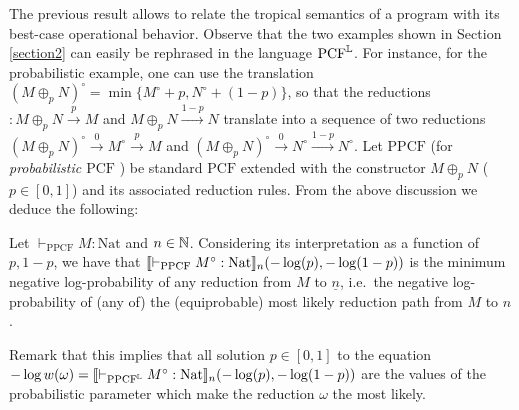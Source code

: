 The previous result allows to relate the tropical semantics of a program with its best-case operational behavior.  
Observe that the two examples shown in Section \ref{section2} can easily be rephrased in the language $\mathrm{PCF}^{\mathbb{L}}$. 
For instance, for the probabilistic example, %
one can use the translation $(M\oplus_{p}N)^{\circ}= \min\{M^{\circ}+p, N^{\circ}+(1-p)\}$, so that the reductions $:M\oplus_{p}N\stackrel{p}{\to} M$ and $M\oplus_{p}N\stackrel{1-p}{\to} N$ translate into a sequence of two reductions $(M\oplus_{p}N)^{\circ} \stackrel{0}{\to} M^{\circ}\stackrel{p}{\to} M$ and $(M\oplus_{p}N)^{\circ} \stackrel{0}{\to} N^{\circ}\stackrel{1-p}{\to} N^{\circ}$. %
Let $\mathrm{PPCF}$ (for \emph{probabilistic $\mathrm{PCF}$} \cite{Pagani2018}) be standard $\mathrm{PCF}$ extended with the constructor $M\oplus_{p}N$ ($p\in[0,1]$) and its associated reduction rules. From the above discussion we deduce the following:

\begin{corollary}
Let $\vdash_{\mathrm{PPCF}} M:\mathrm{Nat}$ and $n\in\mathbb{N}$.
Considering its interpretation as a function of $p,1-p$, we have that $\llbracket\vdash_{\mathrm{PPCF}} M^{\circ}:\mathrm{Nat}\rrbracket_{n}(-\log(p),-\log(1-p))$ %
is the minimum negative log-probability of any reduction from $M$ to $\underline n$, i.e.\ the negative log-probability of (any of) the (equiprobable) most likely reduction path from $M$ to $n$.
\end{corollary}

Remark that this implies that all solution $p\in[0,1]$ to the equation $-\log \mathsf  w(\omega)= \model{\vdash_{\mathrm{PPCF}^{\Lawv}} M^{\circ}:\mathrm{Nat}}_{n}(-\log(p),-\log(1-p))$ are the values of the probabilistic parameter which make the reduction $\omega$ the most likely.

